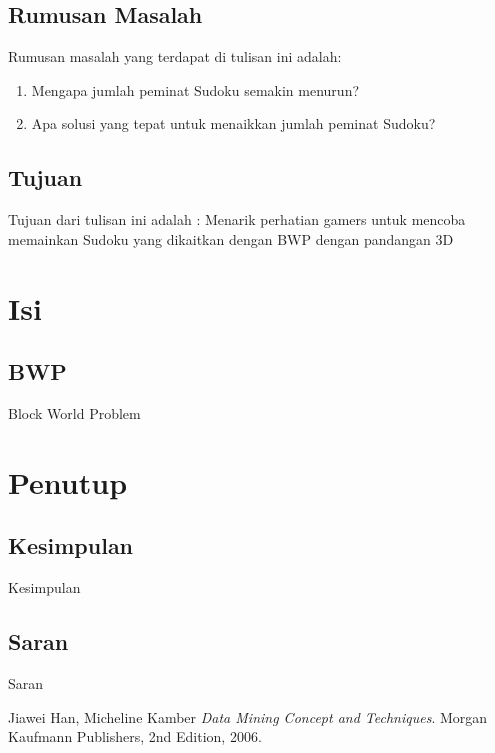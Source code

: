 \documentclass[11pt,a4paper]{report}
\begin{document}
\section{Rumusan Masalah}
Rumusan masalah yang terdapat di tulisan ini adalah:
\begin{enumerate}
	\item Mengapa jumlah peminat Sudoku semakin menurun?
	\item Apa solusi yang tepat untuk menaikkan jumlah peminat Sudoku?
\end{enumerate}

\section{Tujuan}
Tujuan dari tulisan ini adalah : Menarik perhatian gamers untuk mencoba memainkan Sudoku yang dikaitkan dengan BWP dengan pandangan 3D

\chapter{Isi} %
\section{BWP}
Block World Problem


\chapter{Penutup} %
\section{Kesimpulan}
Kesimpulan
\section{Saran}
Saran

\begin{thebibliography}{9}


\bibitem{}
  Jiawei Han, Micheline Kamber
  \emph{Data Mining Concept and Techniques}.
  Morgan Kaufmann Publishers,
  2nd Edition,
  2006.

\end{thebibliography}
\end{document}
